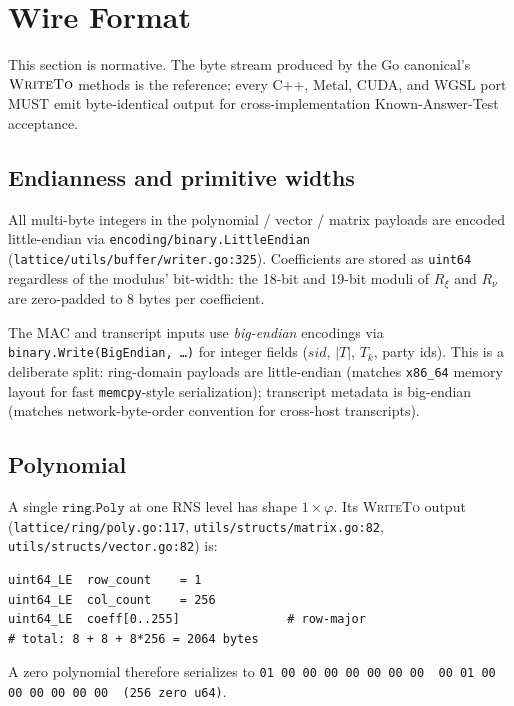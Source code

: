 \section{Wire Format}
\label{sec:wire-format}

This section is normative. The byte stream produced by the Go canonical's $\textsc{WriteTo}$ methods is the reference; every C++, Metal, CUDA, and WGSL port \cite{lp137} MUST emit byte-identical output for cross-implementation Known-Answer-Test acceptance.

\subsection{Endianness and primitive widths}

All multi-byte integers in the polynomial / vector / matrix payloads are encoded little-endian via \texttt{encoding/binary.LittleEndian} \cite{lattigov7} (\texttt{lattice/utils/buffer/writer.go:325}). Coefficients are stored as \texttt{uint64} regardless of the modulus' bit-width: the 18-bit and 19-bit moduli of $R_\xi$ and $R_\nu$ are zero-padded to 8 bytes per coefficient.

The MAC and transcript inputs use \emph{big-endian} encodings via \texttt{binary.Write(BigEndian, \ldots)} for integer fields ($\mathit{sid}$, $|T|$, $T_k$, party ids). This is a deliberate split: ring-domain payloads are little-endian (matches \texttt{x86\_64} memory layout for fast \texttt{memcpy}-style serialization); transcript metadata is big-endian (matches network-byte-order convention for cross-host transcripts).

\subsection{Polynomial}

A single $\texttt{ring.Poly}$ at one RNS level has shape $1 \times \varphi$. Its \textsc{WriteTo} output (\texttt{lattice/ring/poly.go:117}, \texttt{utils/structs/matrix.go:82}, \texttt{utils/structs/vector.go:82}) is:

\begin{lstlisting}[caption={Polynomial wire format ($\varphi = 256$).}]
uint64_LE  row_count    = 1
uint64_LE  col_count    = 256
uint64_LE  coeff[0..255]               # row-major
# total: 8 + 8 + 8*256 = 2064 bytes
\end{lstlisting}

A zero polynomial therefore serializes to \texttt{01 00 00 00 00 00 00 00 \textbar\ 00 01 00 00 00 00 00 00 \textbar\ (256 zero u64)}.

